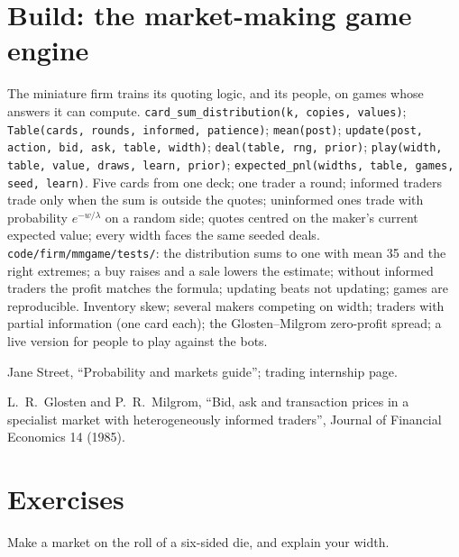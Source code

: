 \section{Build: the market-making game engine}\label{bld:m2:market-making-games:mmgame}

\begin{build}
 The miniature firm trains its quoting logic, and its people, on games
whose answers it can compute.
 \texttt{card\_sum\_distribution(k, copies, values)};
\texttt{Table(cards, rounds, informed, patience)}; \texttt{mean(post)};
\texttt{update(post, action, bid, ask, table, width)}; \texttt{deal(table, rng, prior)};
\texttt{play(width, table, value, draws, learn, prior)}; \texttt{expected\_pnl(widths,
table, games, seed, learn)}.
 Five cards from one deck; one trader a round; informed traders trade only
when the sum is outside the quotes; uninformed ones trade with probability
$e^{-w/\lambda}$ on a random side; quotes centred on the maker's current expected value;
every width faces the same seeded deals.
 \texttt{code/firm/mmgame/tests/}: the distribution sums to one
with mean 35 and the right extremes; a buy raises and a sale lowers the estimate; without
informed traders the profit matches the formula; updating beats not updating; games are
reproducible.
 Inventory skew; several makers competing on width; traders with partial
information (one card each); the Glosten--Milgrom zero-profit spread; a live version for
people to play against the bots.
\end{build}

\begin{omsources}
\item Jane Street, ``Probability and markets guide''; trading internship page.
\item L.~R.~Glosten and P.~R.~Milgrom, ``Bid, ask and transaction prices in a specialist
market with heterogeneously informed traders'', Journal of Financial Economics 14 (1985).
\end{omsources}

\section{Exercises}

\begin{exercise}[$\star$]\label{exo:m2:market-making-games:1}
Make a market on the roll of a six-sided die, and explain your width.
\end{exercise}

